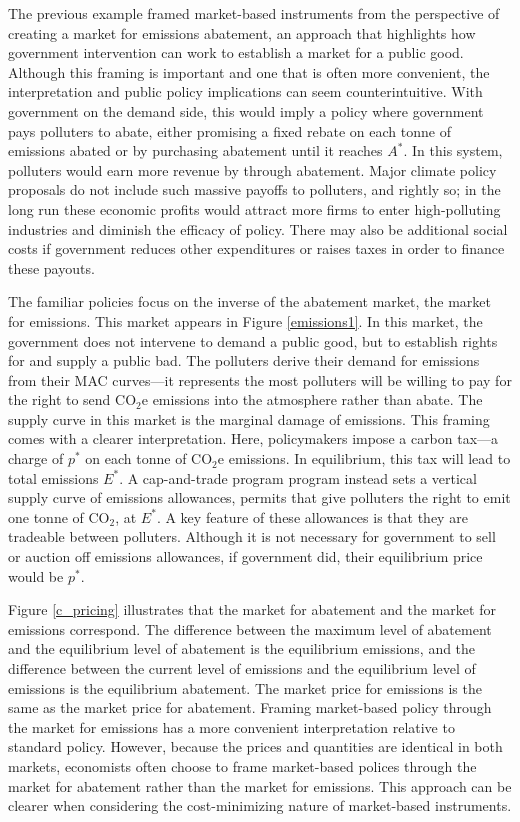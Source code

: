 The previous example framed market-based instruments from the perspective of creating a market for emissions abatement, an approach that highlights how government intervention can work to establish a market for a public good. Although this framing is important and one that is often more convenient, the interpretation and public policy implications can seem counterintuitive. With government on the demand side, this would imply a policy where government pays polluters to abate, either promising a fixed rebate on each tonne of emissions abated or by purchasing abatement until it reaches $A^*$. In this system, polluters would earn more revenue by through abatement. Major climate policy proposals do not include such massive payoffs to polluters, and rightly so; in the long run these economic profits would attract more firms to enter high-polluting industries and diminish the efficacy of policy. There may also be additional social costs if government reduces other expenditures or raises taxes in order to finance these payouts. 

The familiar policies focus on the inverse of the abatement market, the market for emissions. This market appears in Figure \ref{emissions1}. In this market, the government does not intervene to demand a public good, but to establish rights for and supply a public bad. The polluters derive their demand for emissions from their MAC curves---it represents the most polluters will be willing to pay for the right to send CO$_2$e emissions into the atmosphere rather than abate. The supply curve in this market is the marginal damage of emissions. This framing comes with a clearer interpretation. Here, policymakers impose a carbon tax---a charge of $p^*$ on each tonne of CO$_2$e emissions. In equilibrium, this tax will lead to total emissions $E^*$. A cap-and-trade program program instead sets a vertical supply curve of emissions allowances, permits that give polluters the right to emit one tonne of CO$_2$, at $E^*$. A key feature of these allowances is that they are tradeable between polluters. Although it is not necessary for government to sell or auction off emissions allowances, if government did, their equilibrium price would be $p^*$. 

Figure \ref{c_pricing} illustrates that the market for abatement and the market for emissions correspond. The difference between the maximum level of abatement and the equilibrium level of abatement is the equilibrium emissions, and the difference between the current level of emissions and the equilibrium level of emissions is the equilibrium abatement. The market price for emissions is the same as the market price for abatement. Framing market-based policy through the market for emissions has a more convenient interpretation relative to standard policy. However, because the prices and quantities are identical in both markets, economists often choose to frame market-based polices through the market for abatement rather than the market for emissions. This approach can be clearer when considering the cost-minimizing nature of market-based instruments.


